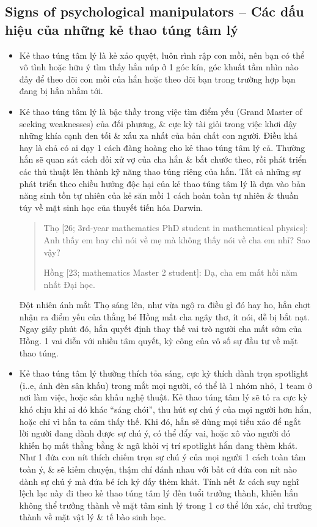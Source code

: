 \documentclass[12pt,oneside]{book}
\begin{document}
\subsection{Signs of psychological manipulators -- Các dấu hiệu của những kẻ thao túng tâm lý}

\begin{itemize}
	\item Kẻ thao túng tâm lý là kẻ xảo quyệt, luôn rình rập con mồi, nên bạn có thể vô tình hoặc hữu ý tìm thấy hắn núp ở 1 góc kín, góc khuất tầm nhìn nào đấy để theo dõi con mồi của hắn hoặc theo dõi bạn trong trường hợp bạn đang bị hắn nhắm tới.
	\item Kẻ thao túng tâm lý là bậc thầy trong việc tìm điểm yếu (Grand Master of seeking weaknesses) của đối phương, \& cực kỳ tài giỏi trong việc khơi dậy những khía cạnh đen tối \& xấu xa nhất của bản chất con người. Điều khá hay là chả có ai dạy 1 cách đàng hoàng cho kẻ thao túng tâm lý cả. Thường hắn sẽ quan sát cách đối xử vợ của cha hắn \& bắt chước theo, rồi phát triển các thủ thuật lên thành kỹ năng thao túng riêng của hắn. Tất cả những sự phát triển theo chiều hướng độc hại của kẻ thao túng tâm lý là dựa vào bản năng sinh tồn tự nhiên của kẻ săn mồi 1 cách hoàn toàn tự nhiên \& thuần túy về mặt sinh học của thuyết tiến hóa Darwin.
	\begin{quote}
		{\sf Thọ [26; 3rd-year mathematics PhD student in mathematical physics]}: Anh thấy em hay chỉ nói về mẹ mà không thấy nói về cha em nhỉ? Sao vậy?
		
		{\sf Hồng [23; mathematics Master 2 student]}: Dạ, cha em mất hồi năm nhất Đại học.
	\end{quote}
	Đột nhiên ánh mắt {\sf Thọ} sáng lên, như vừa ngộ ra điều gì đó hay ho, hắn chợt nhận ra điểm yếu của thằng bé {\sf Hồng} mất cha ngây thơ, ít nói, dễ bị bắt nạt. Ngay giây phút đó, hắn quyết định thay thế vai trò người cha mất sớm của {\sf Hồng}. 1 vai diễn với nhiều tâm quyết, kỳ công của vô số sự đầu tư về mặt thao túng.	
	\item Kẻ thao túng tâm lý thường thích tỏa sáng, cực kỳ thích dành trọn spotlight (i..e, ánh đèn sân khấu) trong mắt mọi người, có thể là 1 nhóm nhỏ, 1 team ở nơi làm việc, hoặc sân khấu nghệ thuật. Kẻ thao túng tâm lý sẽ tỏ ra cực kỳ khó chịu khi ai đó khác ``sáng chói'', thu hút sự chú ý của mọi người hơn hắn, hoặc chỉ vì hắn ta cảm thấy thế. Khi đó, hắn sẽ dùng mọi tiểu xảo để ngắt lời người đang dành được sự chú ý, có thể đẩy vai, hoặc xô vào người đó khiến họ mất thằng bằng \& ngã khỏi vị trí spotlight hắn đang thèm khát. Như 1 đứa con nít thích chiếm trọn sự chú ý của mọi người 1 cách toàn tâm toàn ý, \& sẽ kiếm chuyện, thậm chí đánh nhau với bất cứ đứa con nít nào dành sự chú ý mà đứa bé ích kỷ đấy thèm khát. Tính nết \& cách suy nghĩ lệch lạc này đi theo kẻ thao túng tâm lý đến tuổi trưởng thành, khiến hắn không thể trưởng thành về mặt tâm sinh lý trong 1 cơ thể lớn xác, chỉ trưởng thành về mặt vật lý \& tế bào sinh học.
\end{itemize}
\end{document}
